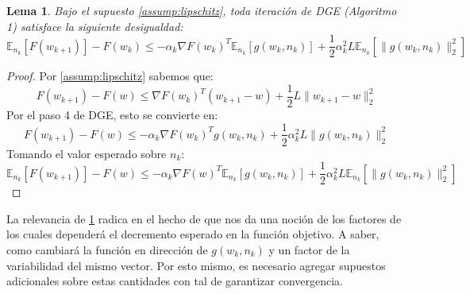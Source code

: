 \documentclass{book}
\theoremstyle{plain}
\newtheorem{lem}[thm]{Lema}
\theoremstyle{definition}
\theoremstyle{remark}
\begin{document}
\begin{lem}\label{lem:markov}
Bajo el supuesto \ref{assump:lipschitz}, toda iteración de DGE (Algoritmo 1) satisface la siguiente desigualdad:
\begin{equation}
    \mathbb{E}_{n_k}[F(w_{k+1})] - F(w_{k}) \leq -\alpha_k\nabla F(w_{k})^T\mathbb{E}_{n_k}[g(w_{k}, n_{k})]+\frac{1}{2}\alpha^2_kL\mathbb{E}_{n_k}[\|g(w_{k}, n_{k})\|_2^2]
\end{equation}
\end{lem}

\begin{proof}

Por \ref{assump:lipschitz} sabemos que:
\begin{equation*}
    F(w_{k+1}) - F(w) \leq  \nabla F(w_{k})^T(w_{k+1}- w) + \frac{1}{2}L\|w_{k+1} - w\|_2^2
\end{equation*}
Por el paso 4 de DGE, esto se convierte en:
\begin{equation*}
    F(w_{k+1}) - F(w) \leq  -\alpha_k\nabla F(w_k)^Tg(w_k, n_k) + \frac{1}{2}\alpha_k^2L\|g(w_k, n_k)\|_2^2
\end{equation*}
Tomando el valor esperado sobre $n_k$:
\begin{equation*}
    \mathbb{E}_{n_k}[F(w_{k+1})] - F(w) \leq  - \alpha_k\nabla F(w)^T\mathbb{E}_{n_k}[g(w_k, n_k)] + \frac{1}{2}\alpha_k^2L\mathbb{E}_{n_k}[\|g(w_k, n_k)\|_2^2]
\end{equation*}
\end{proof}

La relevancia de \ref{lem:markov} radica en el hecho de que nos da una noción de los factores de los cuales dependerá el decremento esperado en la función objetivo. A saber, como cambiará la función en dirección de $g(w_k, n_k)$ y un factor de la variabilidad del mismo vector. Por esto mismo, es necesario agregar supuestos adicionales sobre estas cantidades con tal de garantizar convergencia.
\end{document}

